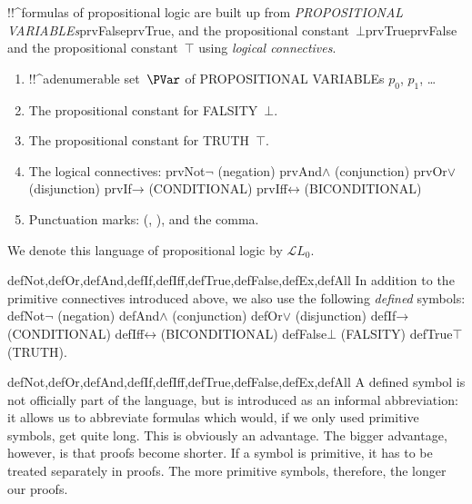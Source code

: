 \documentclass[10pt,a4paper]{article}
\newcommand*{\olup}[1]{\MakeUppercase{#1}}
\theoremstyle{plain}
\theoremstyle{definition}
\theoremstyle{remark}
\newenvironment{explain}{}{}
\providecommand{\lif}{\mathbin{\rightarrow}}
\providecommand{\ltrue}{\top}
\providecommand{\lfalse}{\bot}
\providecommand{\Obj}{}
\providecommand{\Lang}{\ensuremath{\mathcal{L}}}
\providecommand{\iftag}[1]{#1}
\providecommand{\tagitem}[1]{\item[#1]}
\providecommand{\liff}{\mathbin{\leftrightarrow}}
\providecommand{\iftag}{}
\begin{document}
!!^{formula}s of propositional logic are built up from
\emph{\olup{propositional
    variable}s}\iftag{prvFalse}{\iftag{prvTrue}{,}{ and} the
  propositional constant~$\lfalse$}{}\iftag{prvTrue}{\iftag{prvFalse}{
    and}{} the propositional constant~$\ltrue$}{} using \emph{logical
  connectives}.

\begin{enumerate}
\item !!^a{denumerable} set~$\PVar$ of \olup{propositional variable}s $\Obj p_0$,
  $\Obj p_1$, \dots
\tagitem{prvFalse}{The propositional constant for \olup{falsity}~$\lfalse$.}{}
\tagitem{prvTrue}{The propositional constant for \olup{truth}~$\ltrue$.}{}
\item The logical connectives:
  \startycommalist
  \iftag{prvNot}{\ycomma $\lnot$ (negation)}{}%
  \iftag{prvAnd}{\ycomma $\land$ (conjunction)}{}%
  \iftag{prvOr}{\ycomma $\lor$ (disjunction)}{}%
  \iftag{prvIf}{\ycomma $\lif$ (\olup{conditional})}{}%
  \iftag{prvIff}{\ycomma $\liff$ (\olup{biconditional})}{}%
\item Punctuation marks: (, ), and the comma.
\end{enumerate}

We denote this language of propositional logic by $\Lang L_0$.

\iftag{defNot,defOr,defAnd,defIf,defIff,defTrue,defFalse,defEx,defAll}{%
In addition to the primitive connectives introduced
above, we also use the following \emph{defined} symbols:
\startycommalist
  \iftag{defNot}{\ycomma $\lnot$ (negation)}{}%
  \iftag{defAnd}{\ycomma $\land$ (conjunction)}{}%
  \iftag{defOr}{\ycomma $\lor$ (disjunction)}{}%
  \iftag{defIf}{\ycomma $\lif$ (\olup{conditional})}{}%
  \iftag{defIff}{\ycomma $\liff$ (\olup{biconditional})}{}%
  \iftag{defFalse}{\ycomma $\lfalse$ (\olup{falsity})}{}%
  \iftag{defTrue}{\ycomma $\ltrue$ (\olup{truth})}}{}.

\begin{tagblock}{defNot,defOr,defAnd,defIf,defIff,defTrue,defFalse,defEx,defAll}
\begin{explain}
A defined symbol is not officially part of the language, but is
introduced as an informal abbreviation: it allows us to abbreviate
formulas which would, if we only used primitive symbols, get quite
long.  This is obviously an advantage.  The bigger advantage, however,
is that proofs become shorter.  If a symbol is primitive, it has to be
treated separately in proofs. The more primitive symbols, therefore,
the longer our proofs.
\end{explain}
\end{tagblock}
\end{document}
